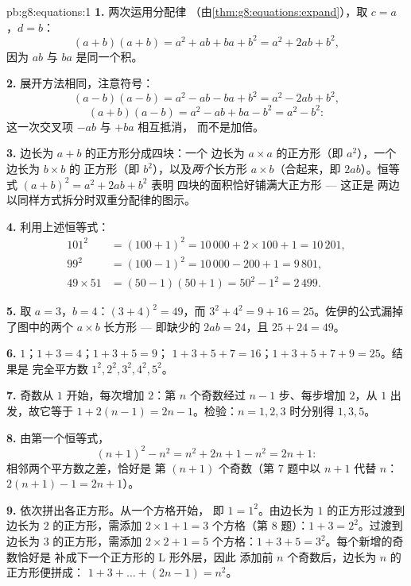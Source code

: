 \begin{solution}{pb:g8:equations:1}
\textbf{1.} 两次运用分配律
（由\cref{thm:g8:equations:expand}），取 $c = a$，$d = b$：
\[
(a + b)(a + b) = a^2 + ab + ba + b^2 = a^2 + 2ab + b^2 ,
\]
因为 $ab$ 与 $ba$ 是同一个积。

\textbf{2.} 展开方法相同，注意符号：
\[
(a - b)(a - b) = a^2 - ab - ba + b^2 = a^2 - 2ab + b^2 ,
\]
\[
(a + b)(a - b) = a^2 - ab + ba - b^2 = a^2 - b^2 :
\]
这一次交叉项 $-ab$ 与 $+ba$ 相互抵消，
而不是加倍。

\textbf{3.} 边长为 $a + b$ 的正方形分成四块：一个
边长为 $a \times a$ 的正方形（即 $a^2$），一个边长为 $b \times b$ 的
正方形（即 $b^2$），以及\emph{两个}长方形 $a \times b$（合起来，即
$2ab$）。恒等式 $(a+b)^2 = a^2 + 2ab + b^2$ 表明
四块的面积恰好铺满大正方形 --- 这正是
两边以同样方式拆分时双重分配律的图示。

\textbf{4.} 利用上述恒等式：
\begin{align*}
101^2 &= (100 + 1)^2 = 10\,000 + 2 \times 100 + 1 = 10\,201, \\
99^2 &= (100 - 1)^2 = 10\,000 - 200 + 1 = 9\,801, \\
49 \times 51 &= (50 - 1)(50 + 1) = 50^2 - 1^2 = 2\,499 .
\end{align*}

\textbf{5.} 取 $a = 3$，$b = 4$：$(3 + 4)^2 = 49$，而
$3^2 + 4^2 = 9 + 16 = 25$。佐伊的公式漏掉了图中的两个
$a \times b$ 长方形 --- 即缺少的
$2ab = 24$，且 $25 + 24 = 49$。

\textbf{6.} $1$；$1 + 3 = 4$；$1 + 3 + 5 = 9$；
$1 + 3 + 5 + 7 = 16$；$1 + 3 + 5 + 7 + 9 = 25$。结果是
完全平方数 $1^2, 2^2, 3^2, 4^2, 5^2$。

\textbf{7.} 奇数从 $1$ 开始，每次增加
$2$：第 $n$ 个奇数经过 $n - 1$ 步、每步增加 $2$，从
$1$ 出发，故它等于 $1 + 2(n - 1) = 2n - 1$。检验：$n = 1, 2, 3$
时分别得 $1, 3, 5$。

\textbf{8.} 由第一个恒等式，
\[
(n + 1)^2 - n^2 = n^2 + 2n + 1 - n^2 = 2n + 1 :
\]
相邻两个平方数之差，恰好是
第 $(n+1)$ 个奇数（第 7 题中以 $n + 1$ 代替 $n$：
$2(n+1) - 1 = 2n + 1$）。

\textbf{9.} 依次拼出各正方形。从一个方格开始，
即 $1 = 1^2$。由边长为 $1$ 的正方形过渡到
边长为 $2$ 的正方形，需添加 $2 \times 1 + 1 = 3$ 个方格（第
8 题）：$1 + 3 = 2^2$。过渡到边长为 $3$ 的正方形，需添加 $2 \times 2 + 1 = 5$
个方格：$1 + 3 + 5 = 3^2$。每个新增的奇数恰好是
补成下一个正方形的 L 形外层，因此
添加前 $n$ 个奇数后，边长为 $n$ 的正方形便拼成：
$1 + 3 + \dots + (2n - 1) = n^2$。


\end{solution}
